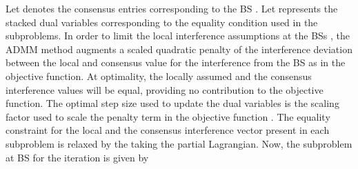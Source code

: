 Let  denotes the consensus entries corresponding to the \ac{BS} . Let  represents the stacked dual variables corresponding to the equality condition  used in the subproblems. In order to limit the local interference assumptions  at the \acp{BS} , the \ac{ADMM} method augments a scaled quadratic penalty of the interference deviation between the local and consensus value for the interference from the \ac{BS}  as  in the objective function. At optimality, the locally assumed and the consensus interference values will be equal,  providing no contribution to the objective function. The optimal step size used to update the dual variables is the scaling factor \me{\rho} used to scale the penalty term in the objective function \cite{boyd2011distributed,bertsekas1999nonlinear}. The equality constraint for the local and the consensus interference vector  present in each subproblem is relaxed by the taking the partial Lagrangian. Now, the subproblem at \ac{BS}  for the  iteration is given by
